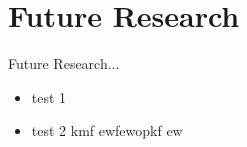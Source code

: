 \chapter{Future Research}
\label{Future Research}
Future Research...
\begin{itemize}
	\item test 1
	\item test 2 kmf ewfewopkf ew
\end{itemize}
